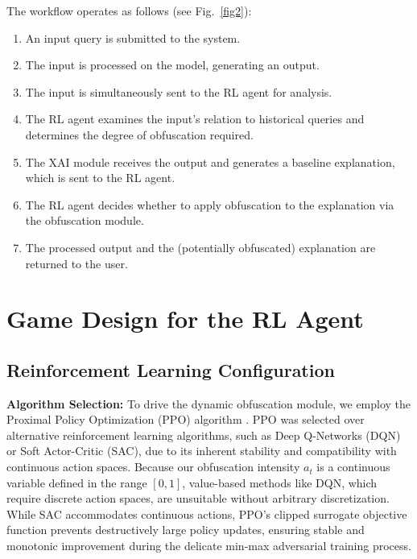 \documentclass[conference]{IEEEtran}
\begin{document}
The workflow operates as follows (see Fig.~\ref{fig2}):
\begin{enumerate}
    \item An input query is submitted to the system.
    \item The input is processed on the model, generating an output.
    \item The input is simultaneously sent to the RL agent for analysis.
    \item The RL agent examines the input's relation to historical queries and determines the degree of obfuscation required.
    \item The XAI module receives the output and generates a baseline explanation, which is sent to the RL agent.
    \item The RL agent decides whether to apply obfuscation to the explanation via the obfuscation module.
    \item The processed output and the (potentially obfuscated) explanation are returned to the user.
\end{enumerate}

\section{Game Design for the RL Agent}
\subsection{Reinforcement Learning Configuration}

\textbf{Algorithm Selection:} 
To drive the dynamic obfuscation module, we employ the Proximal Policy Optimization (PPO) algorithm \cite{b23}. PPO was selected over alternative reinforcement learning algorithms, such as Deep Q-Networks (DQN) or Soft Actor-Critic (SAC), due to its inherent stability and compatibility with continuous action spaces. Because our obfuscation intensity $a_t$ is a continuous variable defined in the range $[0, 1]$, value-based methods like DQN, which require discrete action spaces, are unsuitable without arbitrary discretization. While SAC accommodates continuous actions, PPO's clipped surrogate objective function prevents destructively large policy updates, ensuring stable and monotonic improvement during the delicate min-max adversarial training process.
\end{document}
